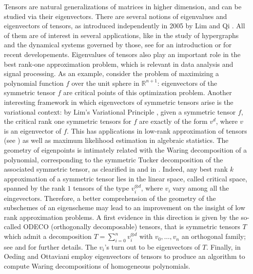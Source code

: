\documentclass[11pt, a4paper, reqno, captions=tableheading,bibliography=totoc]{scrartcl}
\theoremstyle{plain}
\theoremstyle{definition}
\newcommand{\R}{\mathbb{R}}
\begin{document}
Tensors are natural generalizations of matrices in higher dimension, and can be studied via their eigenvectors. There are several notions of eigenvalues and eigenvectors of tensors, as introduced independently in 2005 by Lim \cite{Lim} and Qi \cite{Qi}. All of them are of interest in several applications, like in the study of hypergraphs and the dynamical systems governed by those, see \cite[Section 4]{QZ} for an introduction or \cite{GMV} for recent developements. Eigenvalues of tensors also play an important role in the best rank-one approximation problem, which is relevant in data analysis and signal processing. As an example, consider the problem of maximizing a polynomial function $f$ over the unit sphere in $\R^{n+1}$: eigenvectors of the symmetric tensor $f$ are critical points of this optimization problem. Another interesting framework in which eigenvectors of symmetric tensors arise is the variational context: by Lim's Variational Principle \cite{Lim}, given a symmetric tensor $f$, the critical rank one symmetric tensors for $f$ are exactly of the form $v^d$, where $v$ is an eigenvector of $f$.
This has applications in low-rank approximation of tensors (see \cite{OttSod}) as well as maximum likelihood estimation in algebraic statistics.
The geometry of eigenpoints is intimately related with the Waring decomposition of a polynomial,
corresponding to the symmetric Tucker decomposition of the associated symmetric tensor,
as clearified in \cite{DOT} and in \cite{Ott}. Indeed, any best rank $k$ approximation of a symmetric tensor lies in the linear
space, called {critical space},  spanned by the rank $1$ tensors of the type $v_i ^{\otimes d}$, where $v_i$ vary among all the eingevectors. Therefore, a better comprehension of the geometry of the subschemes of an eigenscheme may lead to an improvement on the insight of low rank approximation problems. A first evidence in this direction is given by the so-called ODECO (orthogonally decomposable) tensors, that is symmetric tensors $T$ which admit a decomposition
$T= \sum _{i=0}^n v_i ^{\otimes d}$ with $v_0, \dotsc, v_n$ an orthogonal family; see \cite{Rob} and \cite{BDHE}
for further details. The $v_i$'s turn out to be eigenvectors of $T$. Finally, in \cite{OO} Oeding and Ottaviani employ eigenvectors of tensors to produce an algorithm to compute Waring decompositions of homogeneous polynomials.
\end{document}
